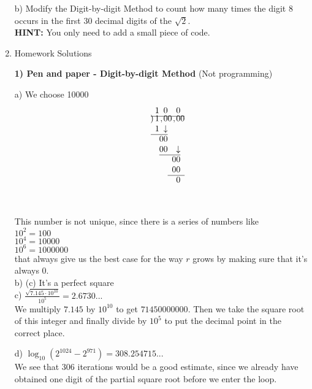 \documentclass{uofa_template}
\begin{document}
\begin{enumerate}
b) Modify the Digit-by-digit Method to count how many times the digit 8 occurs in the first 30 decimal digits of the $\sqrt{2}$. \\
\textbf{HINT:} You only need to add a small piece of code. \\

\item Homework Solutions

\textbf{1) Pen and paper - Digit-by-digit Method} (Not programming)

a) We choose 10000 \\
\[
\begin{array}{ r *{32}{c@{}} }
& 1 & &  0 & & & 0  \\ \cline{2-10}\\[-14.5pt]
\multicolumn{1}{r}{\rlap{\kern4.5pt)}} & 1 & , & 0 & 0 & , &0 & 0 \\
& 1 && \downarrow \\ \cline{2-4}
& & 0  & 0  \\
& & 0  & 0 &&& \downarrow \\  \cline{3-7}
& & & &  & 0 & 0 \\
& & & &  & 0 & 0 \\   \cline{5-9}
& & & & & & 0  \\
\\ \cline{8-20}
& & & & & & &  &  & &  &  &
\end{array}
\]

This number is not unique, since there is a series of numbers like \\
$10^2 = 100$ \\
$10^4 = 10000$ \\
$10^6 = 1000000$ \\
that always give us the best case for the way $r$ grows by making sure that it's always $0$. \\

b) (c) It's a perfect square \\

c) $\frac{\sqrt{7.145 \cdot 10^{10}}}{10^5} = 2.6730...$ \\
We multiply $7.145$ by $10^{10}$ to get $71450000000$. Then
we take the square root of this integer and finally divide by $10^{5}$ to put the decimal point in the correct place.

d) $\log_{10} (2^{1024} - 2^{971}) = 308.254715...$ \\
We see that 306 iterations would be a good estimate, since we already have obtained one digit of the partial square root before we enter the loop.


\end{enumerate}
\end{document}
